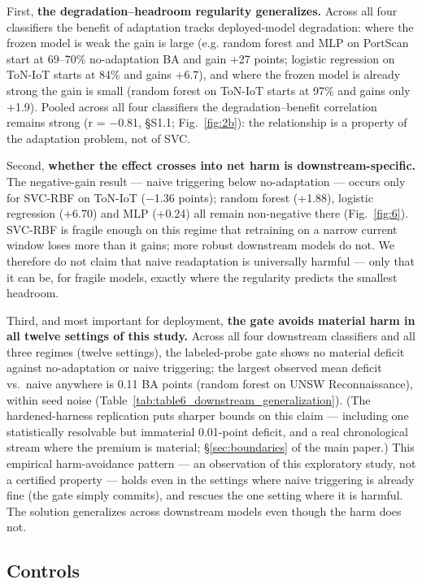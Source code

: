 \documentclass[a4paper,11pt]{article}
\makeatletter
\let\supp@subsection\subsection
\renewcommand{\subsection}{\FloatBarrier\supp@subsection}
\makeatother
\begin{document}
First, \textbf{the degradation--headroom regularity generalizes.} Across all four classifiers the benefit of adaptation tracks deployed-model degradation: where the frozen model is weak the gain is large (e.g. random forest and MLP on PortScan start at 69--70\% no-adaptation BA and gain +27 points; logistic regression on ToN-IoT starts at 84\% and gains +6.7), and where the frozen model is already strong the gain is small (random forest on ToN-IoT starts at 97\% and gains only +1.9). Pooled across all four classifiers the degradation--benefit correlation remains strong (r = $-$0.81, \S S1.1; Fig.~\ref{fig:2b}): the relationship is a property of the adaptation problem, not of SVC.


Second, \textbf{whether the effect crosses into net harm is downstream-specific.} The negative-gain result --- naive triggering below no-adaptation --- occurs only for SVC-RBF on ToN-IoT ($-$1.36 points); random forest (+1.88), logistic regression (+6.70) and MLP (+0.24) all remain non-negative there (Fig.~\ref{fig:6}). SVC-RBF is fragile enough on this regime that retraining on a narrow current window loses more than it gains; more robust downstream models do not. We therefore do not claim that naive readaptation is universally harmful --- only that it can be, for fragile models, exactly where the regularity predicts the smallest headroom.


Third, and most important for deployment, \textbf{the gate avoids material harm in all twelve settings of this study.} Across all four downstream classifiers and all three regimes (twelve settings), the labeled-probe gate shows no material deficit against no-adaptation or naive triggering; the largest observed mean deficit vs.\ naive anywhere is 0.11 BA points (random forest on UNSW Reconnaissance), within seed noise (Table~\ref{tab:table6_downstream_generalization}). (The hardened-harness replication puts sharper bounds on this claim --- including one statistically resolvable but immaterial 0.01-point deficit, and a real chronological stream where the premium is material; \S\ref{sec:boundaries} of the main paper.) This empirical harm-avoidance pattern --- an observation of this exploratory study, not a certified property --- holds even in the settings where naive triggering is already fine (the gate simply commits), and rescues the one setting where it is harmful. The solution generalizes across downstream models even though the harm does not.


\subsection{Controls}
\end{document}
